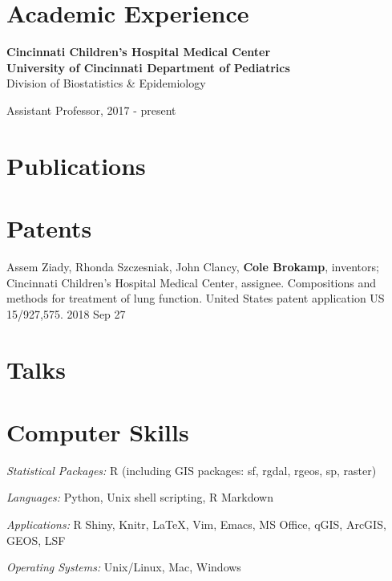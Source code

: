 \documentclass[margin,line]{res}
\newenvironment{list1}{
  \begin{list}{\ding{113}}{%
      \setlength{\itemsep}{0in}
      \setlength{\parsep}{0in} \setlength{\parskip}{0in}
      \setlength{\topsep}{0in} \setlength{\partopsep}{0in}
      \setlength{\leftmargin}{0.17in}}}{\end{list}}
\newenvironment{list3}{
  \begin{list}{}{%
      \setlength{\itemsep}{0in}
      \setlength{\parsep}{0in} \setlength{\parskip}{0in}
      \setlength{\topsep}{0in} \setlength{\partopsep}{0in}
      \setlength{\leftmargin}{0in}}}{\end{list}}
\begin{document}
\begin{resume}
\section{\sc Academic Experience}

{\bf Cincinnati Children's Hospital Medical Center}\\
{\bf University of Cincinnati Department of Pediatrics}\\
Division of Biostatistics \& Epidemiology\\
\vspace*{-.1in}
\begin{list1}
    \item[] Assistant Professor, 2017 - present
\end{list1}



\section{\sc Publications}


\section{\sc Patents}
Assem Ziady, Rhonda Szczesniak, John Clancy, \textbf{Cole Brokamp}, inventors; Cincinnati Children's Hospital Medical Center, assignee. Compositions and methods for treatment of lung function. United States patent application US 15/927,575. 2018 Sep 27

\section{\sc Talks}


\section{\sc Computer Skills}

\begin{list3} \itemsep 4pt
\item[] \textit{Statistical Packages:}  R (including GIS packages: sf, rgdal, rgeos, sp, raster)
\item[] \textit{Languages:} Python, Unix shell scripting, R Markdown
\item[] \textit{Applications:} R Shiny, Knitr, \LaTeX, Vim, Emacs, MS Office, qGIS, ArcGIS, GEOS, LSF
\item[] \textit{Operating Systems:}  Unix/Linux, Mac, Windows\\
\end{list3}


\end{resume}
\end{document}
